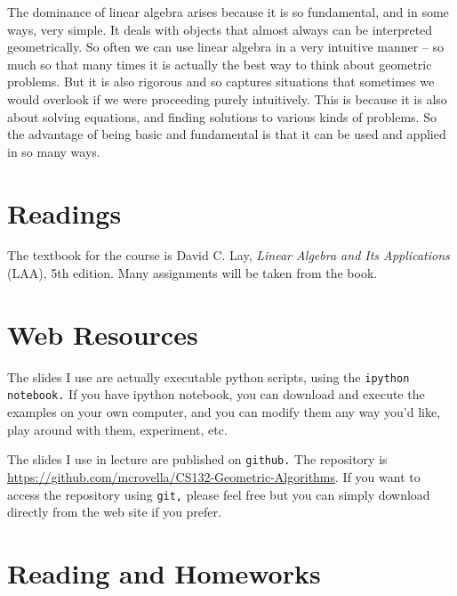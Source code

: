 \documentclass[11pt]{article}
\begin{document}
The dominance of linear algebra arises because it is so fundamental, and
in some ways, very simple. It deals with objects that almost always can
be interpreted geometrically. So often we can use linear algebra in a
very intuitive manner -- so much so that many times it is actually the
best way to think about geometric problems. But it is also rigorous and so
captures situations that sometimes we would overlook if we were
proceeding purely intuitively. This is because it is also about solving
equations, and finding solutions to various kinds of problems. So the
advantage of being basic and fundamental is that it can be used and
applied in so many ways. 

\section*{Readings} 

The textbook for the course is David C. Lay, \emph{Linear Algebra and
  Its Applications} (LAA), 5th edition.    Many assignments will be taken
from the book.

\section*{Web Resources} 

The slides I use are actually executable python scripts, using the
\texttt{ipython notebook.}   If you have ipython notebook, you can
download and execute the examples on your own computer, and you can
modify them any way you'd like, play around with them, experiment, etc.

The slides I use in lecture are published on \texttt{github.}   The
repository is
\url{https://github.com/mcrovella/CS132-Geometric-Algorithms}.  If you want
to access the repository using \texttt{git,} please feel free but you
can simply download directly from the web site if you prefer.
 
\section*{Reading and Homeworks}
\end{document}
